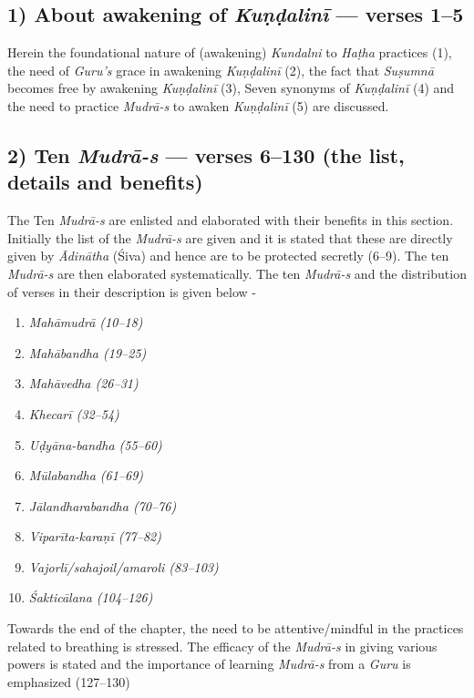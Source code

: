 \subsection*{1) About awakening of \textit{Kuṇḍalinī}  --- verses 1--5}

Herein the foundational nature of (awakening) \textit{Kundalni} to \textit{Haṭha} practices (1), the need of \textit{Guru’s} grace in awakening \textit{Kuṇḍalinī}  (2), the fact that \textit{Suṣumnā} becomes free by awakening \textit{Kuṇḍalinī}  (3), Seven synonyms of \textit{Kuṇḍalinī}  (4) and the need to practice \textit{Mudrā-s} to awaken \textit{Kuṇḍalinī}  (5) are discussed. 

\subsection*{2) Ten \textit{Mudrā-s} --- verses 6--130 (the list, details and benefits)}

The Ten \textit{Mudrā-s} are enlisted and elaborated with their benefits in this section. Initially the list of the \textit{Mudrā-s} are given and it is stated that these are directly given by \textit{Ādinātha} (Śiva) and hence are to be protected secretly (6--9). The ten \textit{Mudrā-s} are then elaborated systematically. The ten  \textit{Mudrā-s}  and the distribution of verses in their description is given below -  

\begin{enumerate}
\item \textit{Mahāmudrā (10--18)}
\item \textit{Mahābandha (19--25) }
\item \textit{Mahāvedha (26--31) }
\item \textit{Khecarī (32--54) }
\item \textit{Uḍyāna-bandha (55--60)}
\item \textit{Mūlabandha (61--69)}
\item \textit{Jālandharabandha (70--76)}
\item \textit{Viparīta-karaṇī (77--82) }
\item \textit{Vajorlī/sahajoil/amaroli (83--103) }
\item \textit{Śakticālana (104--126)}
\end{enumerate}

Towards the end of the chapter, the need to be attentive/mindful in the practices related to breathing is stressed. The efficacy of the \textit{Mudrā-s} in giving various powers is stated and the importance of learning \textit{Mudrā-s} from a \textit{Guru} is emphasized (127--130) 

